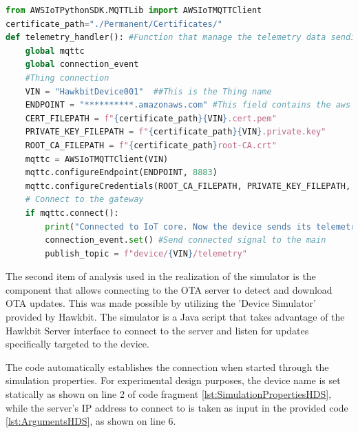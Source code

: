 \begin{lstlisting}[language=Python, caption={MQTT connection to the IoT Core AWS service}, label=lst:MQTTConnection, linerange={1-23}]
from AWSIoTPythonSDK.MQTTLib import AWSIoTMQTTClient
certificate_path="./Permanent/Certificates/"
def telemetry_handler(): #Function that manage the telemetry data sending to IoTCore via mqtt protocol
    global mqttc
    global connection_event
    #Thing connection
    VIN = "HawkbitDevice001"  ##This is the Thing name
    ENDPOINT = "**********.amazonaws.com" #This field contains the aws region
    CERT_FILEPATH = f"{certificate_path}{VIN}.cert.pem"
    PRIVATE_KEY_FILEPATH = f"{certificate_path}{VIN}.private.key"
    ROOT_CA_FILEPATH = f"{certificate_path}root-CA.crt"
    mqttc = AWSIoTMQTTClient(VIN)
    mqttc.configureEndpoint(ENDPOINT, 8883)
    mqttc.configureCredentials(ROOT_CA_FILEPATH, PRIVATE_KEY_FILEPATH, CERT_FILEPATH)
    # Connect to the gateway
    if mqttc.connect():
        print("Connected to IoT core. Now the device sends its telemetry every 1 seconds")
        connection_event.set() #Send connected signal to the main
        publish_topic = f"device/{VIN}/telemetry"
\end{lstlisting}

The second item of analysis used in the realization of the simulator is the component that allows connecting to the OTA server to detect and download OTA updates. This was made possible by utilizing the 'Device Simulator' provided by Hawkbit. The simulator is a Java script that takes advantage of the Hawkbit Server interface to connect to the server and listen for updates specifically targeted to the device.


The code automatically establishes the connection when started through the simulation properties. For experimental design purposes, the device name is set statically as shown on line 2 of code fragment \ref{lst:SimulationPropertiesHDS}, while the server's IP address to connect to is taken as input in the provided code \ref{lst:ArgumentsHDS}, as shown on line 6.

